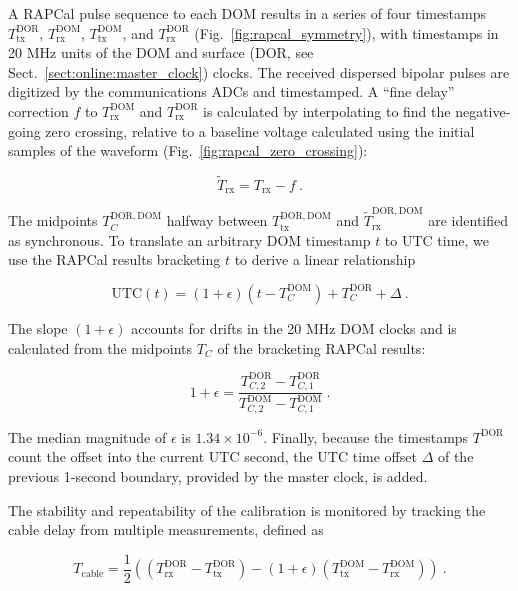 A RAPCal pulse sequence to each DOM results in a series of four timestamps
$T_{\mathrm{tx}}^{\mathrm{DOR}}$, $T_{\mathrm{rx}}^{\mathrm{DOM}}$, 
$T_{\mathrm{tx}}^{\mathrm{DOM}}$,  and $T_{\mathrm{rx}}^{\mathrm{DOR}}$
(Fig.~\ref{fig:rapcal_symmetry}), with timestamps in 20 MHz units
of the DOM and surface (DOR, see Sect.~\ref{sect:online:master_clock}) clocks.  The received dispersed bipolar pulses
are digitized by the communications ADCs and 
timestamped.  A ``fine delay'' correction $f$ to
$T_{\mathrm{rx}}^{\mathrm{DOM}}$ and $T_{\mathrm{rx}}^{\mathrm{DOR}}$ is calculated by interpolating
to find the negative-going zero crossing, relative to a baseline voltage
calculated using the initial samples of the waveform (Fig.~\ref{fig:rapcal_zero_crossing}):

\begin{equation}
  \tilde{T}_{\mathrm{rx}} = T_{\mathrm{rx}} - f\ .
\end{equation}


\noindent The midpoints $T_C^{\mathrm{DOR,DOM}}$ halfway between $T_\mathrm{tx}^{\mathrm{DOR,DOM}}$ and
$\tilde{T}_\mathrm{rx}^{\mathrm{DOR,DOM}}$ are identified as synchronous.
To translate an arbitrary DOM timestamp $t$ to UTC
time, we use the RAPCal results bracketing $t$ to derive a linear
relationship

\begin{equation}
  \mathrm{UTC}(t) = (1+\epsilon)(t - T_C^{\mathrm{DOM}}) +
  T_C^{\mathrm{DOR}} + \Delta\ .
\end{equation}

\noindent The slope $(1+\epsilon)$ accounts for drifts in the 20 MHz DOM
clocks and is calculated from the midpoints $T_C$ of the bracketing RAPCal
results: 

\begin{equation}
  1+\epsilon = \frac{T_{C,2}^{\mathrm{DOR}} -
    T_{C,1}^{\mathrm{DOR}}}{T_{C,2}^{\mathrm{DOM}} -
    T_{C,1}^{\mathrm{DOM}}}\ .
\end{equation}

\noindent The median magnitude of $\epsilon$ is $1.34 \times 10^{-6}$.
Finally, because the timestamps $T^{\mathrm{DOR}}$ count the offset into 
the current UTC second, the UTC time offset $\Delta$ of the previous
1-second boundary, provided by the master clock, is added.

The stability and repeatability of the calibration is monitored by
tracking the cable delay from multiple measurements, defined as

\begin{equation}
  T_{\mathrm{cable}} = \frac{1}{2} \left( ( T_{\mathrm{rx}}^{\mathrm{DOR}} -
  T_{\mathrm{tx}}^{\mathrm{DOR}} ) - (1+\epsilon)(T_{\mathrm{tx}}^{\mathrm{DOM}} -
  T_{\mathrm{rx}}^{\mathrm{DOM}} )\right) \ .
\end{equation}

